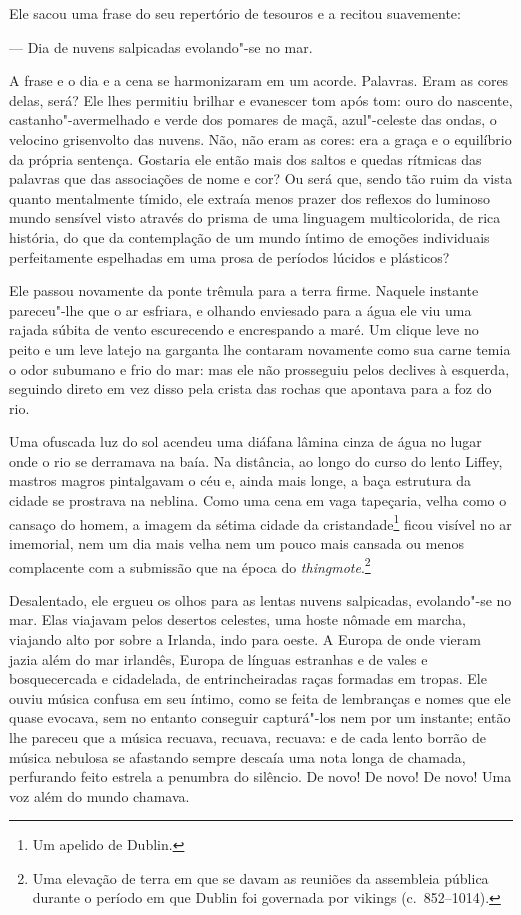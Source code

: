 Ele sacou uma frase do seu repertório de tesouros e a recitou
suavemente:

 --- Dia de nuvens salpicadas evolando"-se no mar.

A frase e o dia e a cena se harmonizaram em um acorde. Palavras. Eram as
cores delas, será? Ele lhes permitiu brilhar e evanescer tom após
tom: ouro do nascente, castanho"-avermelhado e verde dos pomares de
maçã, azul"-celeste das ondas, o velocino grisenvolto das nuvens. Não, 
não eram as cores: era a graça e o equilíbrio da própria sentença.
Gostaria ele então mais dos saltos e quedas rítmicas das palavras que
das associações de nome e cor? Ou será que, sendo tão ruim da vista
quanto mentalmente tímido, ele extraía menos prazer dos reflexos do
luminoso mundo sensível visto através do prisma de uma linguagem
multicolorida, de rica história, do que da contemplação de um mundo
íntimo de emoções individuais perfeitamente espelhadas em uma prosa de
períodos lúcidos e plásticos?

Ele passou novamente da ponte trêmula para a terra firme. Naquele
instante pareceu"-lhe que o ar esfriara, e olhando enviesado para a água
ele viu uma rajada súbita de vento escurecendo e encrespando a maré. Um
clique leve no peito e um leve latejo na garganta lhe contaram
novamente como sua carne temia o odor subumano e frio do mar: mas ele
não prosseguiu pelos declives à esquerda, seguindo direto em vez disso
pela crista das rochas que apontava para a foz do rio.

Uma ofuscada luz do sol acendeu uma diáfana lâmina cinza de água no
lugar onde o rio se derramava na baía. Na distância, ao longo do curso
do lento Liffey, mastros magros pintalgavam o céu e, ainda mais longe,
a baça estrutura da cidade se prostrava na neblina. Como uma cena em
vaga tapeçaria, velha como o cansaço do homem, a imagem da sétima
cidade da cristandade\footnote{ Um apelido de Dublin.} ficou visível no
ar imemorial, nem um dia mais velha nem um pouco mais cansada ou menos
complacente com a submissão que na época do
\textit{thingmote}.\footnote{ Uma elevação de terra em que se davam as
reuniões da assembleia pública durante o período em que Dublin foi
governada por vikings (c.~852--1014).}

Desalentado, ele ergueu os olhos para as lentas nuvens salpicadas,
evolando"-se no mar. Elas viajavam pelos desertos celestes, uma hoste
nômade em marcha, viajando alto por sobre a Irlanda, indo para oeste. A
Europa de onde vieram jazia além do mar irlandês, Europa de línguas
estranhas e de vales e bosquecercada		                        
e cidadelada, de entrincheiradas raças formadas em tropas. Ele ouviu    
música confusa em seu íntimo, como se feita de lembranças e nomes que
ele quase evocava, sem no entanto conseguir capturá"-los nem por um
instante; então lhe pareceu que a música recuava, recuava, recuava: e
de cada lento borrão de música nebulosa se afastando sempre descaía uma
nota longa de chamada, perfurando feito estrela a penumbra do silêncio.
De novo! De novo! De novo! Uma voz além do mundo chamava.

